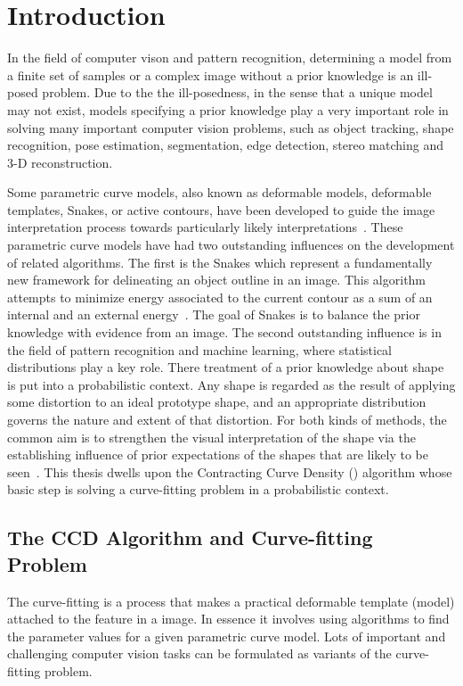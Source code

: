 \chapter{Introduction}
\label{chapter:Introduction}
In the field of computer vison and pattern recognition, determining a
model from a finite set of samples or a complex image without a prior
knowledge is an ill-posed problem. Due to the the ill-posedness, in
the sense that a unique model may not exist, models specifying a prior
knowledge play a very important role in solving many important
computer vision problems, such as object tracking, shape recognition,
pose estimation, segmentation, edge detection, stereo matching and 3-D
reconstruction.

Some parametric curve models, also known as deformable models,
deformable templates, Snakes, or active contours, have been developed
to guide the image interpretation process towards particularly
likely interpretations~\cite{hanek2004fitting}. These parametric curve
models have had two outstanding influences on the
development of related algorithms. The first is the Snakes which
represent a fundamentally new framework for delineating an object
outline in an image. This algorithm attempts to minimize energy
associated to the current contour as a sum of an internal and an external
energy~\cite{kass1988snakes}. The goal of Snakes is to balance the prior
knowledge with evidence from an image. The second outstanding
influence is in the field of pattern recognition and machine learning,
where statistical distributions play a key role.  There treatment
of a prior knowledge about shape is put into a probabilistic
context. Any shape is regarded as the result of applying some
distortion to an ideal prototype shape, and an appropriate
distribution governs the nature and extent of that distortion.
For both kinds of methods, the common aim is to strengthen the visual
interpretation of the shape via the establishing influence of prior
expectations of the shapes that are likely to be
seen~\cite{blake1998active}. This thesis dwells upon the Contracting
Curve Density () algorithm whose basic step is solving a
curve-fitting problem in a probabilistic context.


\section{The CCD Algorithm and Curve-fitting Problem}
\label{sec:ccdcfp}
The curve-fitting is a process that makes
a practical deformable template (model) attached to the feature in a
image. In essence it involves using algorithms to find the parameter
values for a given parametric curve model. Lots of important and
challenging computer vision tasks can be formulated as variants of the
curve-fitting problem. 

